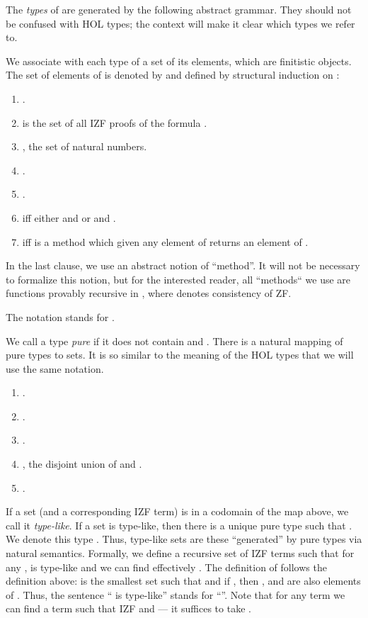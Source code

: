 \documentclass{LMCS}
\begin{document}
The \emph{types} of  are generated by the following abstract grammar.
They should not be confused with HOL types; the context will make it clear
which types we refer to. 


We associate with each type  of  a set of its elements, which are
finitistic objects. The set of elements of  is denoted by 
and defined by structural induction on :

\begin{enumerate}[]
\item .
\item  is the set of all IZF proofs of the formula .
\item , the set of natural numbers.
\item .
\item .
\item  iff either  and  or  and .
\item  iff  is a method which given any
element of  returns an element of .
\end{enumerate}

In the last clause, we use an abstract notion of ``method''. It will not be
necessary to formalize this notion, but for the interested reader, 
all ``methods`` we use are functions provably recursive in ,
where  denotes consistency of ZF. 

The notation  stands for . 

We call a  type \emph{pure} if it does not contain  and . There is a natural mapping of pure types  to sets. It is so similar to the
meaning of the HOL types that we will use the same notation.  
\begin{enumerate}[]
\item .
\item .
\item .
\item , the disjoint union of
 and . 
\item . 
\end{enumerate}
If a set (and a corresponding IZF term) is in a codomain of the map above, we
call it \emph{type-like}. If a set  is type-like, then there is a unique
pure type  such that . We denote this type .
Thus, type-like sets are these ``generated'' by pure  types via
natural semantics. Formally, we define a recursive set  of IZF terms
such that for any ,  is type-like and we can find effectively
. The definition of  follows the definition above:  is the
smallest set such that  and if , then ,  and  are also elements of . Thus, the sentence
`` is type-like'' stands for ``''. Note that for any term  we can find a term  such that IZF  and 
--- it suffices to take . 
\end{document}
